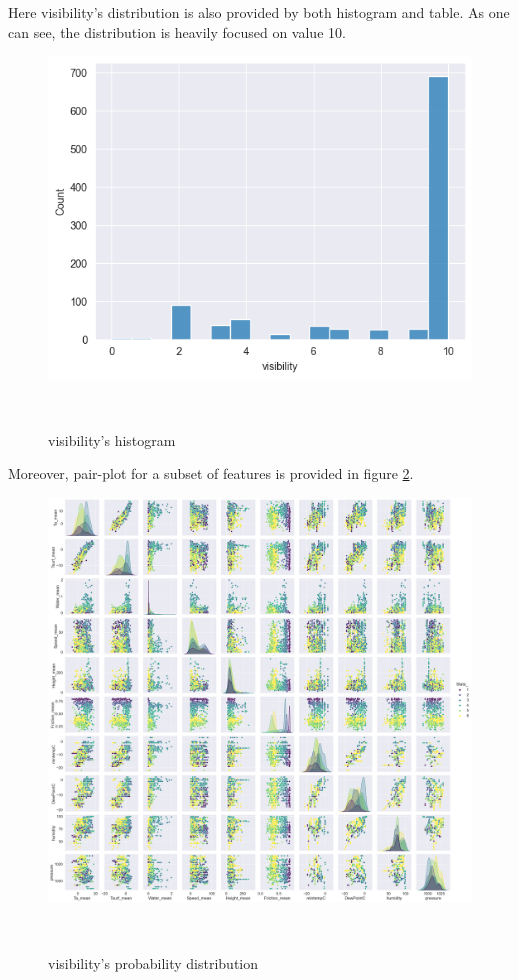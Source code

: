 \documentclass[12pt, bachelor, substylefile = algo_title.rtx]{disser}
\theoremstyle{definition}
\begin{document}
Here visibility's distribution is also provided by both histogram and table. As one can see, the distribution is heavily focused on value 10.

\begin{figure}[!h]
\centering
   \begin{minipage}{0.7\textwidth}
     \includegraphics[width=\linewidth]{visibility_hist}
	\label{fig: 3a}
   \end{minipage}\\
\caption{visibility's histogram}
\label{fig: 3}
\end{figure}

Moreover, pair-plot for a subset of features is provided in figure \ref{fig: 4}.

\begin{figure}[!h]
\centering
   \begin{minipage}{0.9\textwidth}
     \includegraphics[width=.9\linewidth]{pairplot}
	\label{fig: 4a}
   \end{minipage}\\
\caption{visibility's probability distribution}
\label{fig: 4}
\end{figure}
\end{document}
